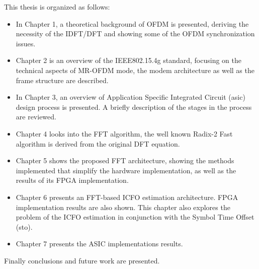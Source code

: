 This thesis is organized as follows:

\begin{itemize}
\item In Chapter 1, a theoretical background of OFDM is presented, deriving the necessity of the IDFT/DFT and showing some of the OFDM synchronization issues.  
\item Chapter 2 is an overview of the IEEE802.15.4g standard, focusing on the technical aspects of MR-OFDM mode, the modem architecture as well as the frame structure are described.  
\item In Chapter 3, an overview of Application Specific Integrated Circuit (\ac{asic}) design process is presented. A briefly description of the stages in the process are reviewed. 
\item Chapter 4 looks into the FFT algorithm, the well known Radix-2 Fast algorithm is derived from the original DFT equation. 
\item Chapter 5 shows the proposed FFT architecture, showing the methods implemented that simplify the hardware implementation, as well as the results of its FPGA implementation.
\item  Chapter 6 presents an FFT-based ICFO estimation architecture. FPGA implementation results are also shown. This chapter also explores the problem of the ICFO estimation in conjunction with the Symbol Time Offset (\ac{sto}).
\item  Chapter 7 presents the ASIC implementations results.
\end{itemize}

Finally conclusions and future work are presented. 




